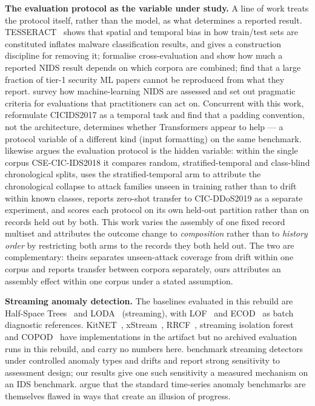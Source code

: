 \documentclass[manuscript,anonymous,review]{acmart}
\begin{document}
\textbf{The evaluation protocol as the variable under study.} A line of work
treats the protocol itself, rather than the model, as what determines a
reported result. TESSERACT~\citep{pendlebury2019tesseract} shows that spatial
and temporal bias in how train/test sets are constituted inflates malware
classification results, and gives a construction discipline for removing it;
\citet{apruzzese2022crosseval} formalise cross-evaluation and
show how much a reported NIDS result depends on which corpora are combined;
\citet{olszewski2023reproducibility} find that a large fraction
of tier-1 security ML papers cannot be reproduced from what they report.
\citet{apruzzese2023sok} survey how
machine-learning NIDS are assessed and set out pragmatic criteria for
evaluations that practitioners can act on.
Concurrent with this work, \citet{moczkodan2026transformers}
reformulate CICIDS2017 as a temporal task and find that a padding convention,
not the architecture, determines whether Transformers appear to help --- a
protocol variable of a different kind (input formatting) on the same benchmark.
\citet{biswas2026protocol} likewise argues the evaluation protocol is the
hidden variable: within the single corpus CSE-CIC-IDS2018 it compares random,
stratified-temporal and class-blind chronological splits, uses the
stratified-temporal arm to attribute the chronological collapse to attack
families unseen in training rather than to drift within known classes, reports
zero-shot transfer to CIC-DDoS2019 as a separate experiment, and scores each
protocol on its own held-out partition rather than on records held out by
both. This work varies the assembly of one fixed record multiset and
attributes the outcome change to \emph{composition} rather than to
\emph{history order} by restricting both arms to the records they both held
out. The two are complementary: theirs separates unseen-attack coverage from
drift within one corpus and reports transfer between corpora separately, ours
attributes an assembly effect within one corpus under a stated assumption.

\textbf{Streaming anomaly detection.} The baselines evaluated in this rebuild
are Half-Space Trees~\citep{tan2011hst} and LODA~\citep{pevny2016loda}
(streaming), with LOF~\citep{breunig2000lof} and ECOD~\citep{li2023ecod} as batch
diagnostic references. KitNET~\citep{mirsky2018kitsune},
xStream~\citep{manzoor2018xstream}, RRCF~\citep{guha2016rrcf}, streaming
isolation forest~\citep{ding2013iforestasd} and COPOD~\citep{li2020copod} have
implementations in the artifact but no archived evaluation runs in this
rebuild, and carry no numbers here. \citet{cao2024revisiting}
benchmark streaming detectors under controlled anomaly types and drifts and
report strong sensitivity to assessment design; our results give one such
sensitivity a measured mechanism on an IDS benchmark. \citet{wu2023flawed} argue that the standard time-series anomaly
benchmarks are themselves flawed in ways that create an illusion of progress.
\end{document}
